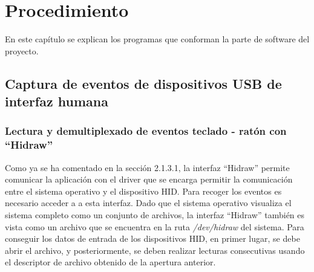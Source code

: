 \chapter{Procedimiento} \label{cap3}

En este capítulo se explican los programas que conforman la parte de software del proyecto.

\newpage


\section{Captura de eventos de dispositivos USB de interfaz humana} \label{s3_1}

\subsection{Lectura y demultiplexado de eventos teclado - ratón con ``Hidraw''} \label{s3_1_1}

Como ya se ha comentado en la sección 2.1.3.1, la interfaz ``Hidraw'' permite comunicar la aplicación con el driver que se encarga permitir la comunicación entre el sistema operativo y el dispositivo HID. Para recoger los eventos es necesario acceder a a esta interfaz. Dado que el sistema operativo visualiza el sistema completo como un conjunto de archivos, la interfaz ``Hidraw'' también es vista como un archivo que se encuentra en la ruta {\itshape /dev/hidraw} del sistema. Para conseguir los datos de entrada de los dispositivos HID, en primer lugar, se debe abrir el archivo, y posteriormente, se deben realizar lecturas consecutivas usando el descriptor de archivo obtenido de la apertura anterior. 

